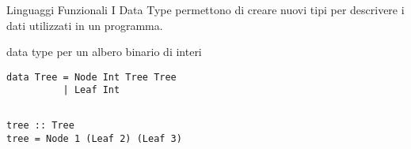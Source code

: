 \begin{frame}[containsverbatim]{Linguaggi Funzionali}
I {\color{blue} Data Type} permettono di creare nuovi tipi per descrivere i dati utilizzati in un programma. \\

\begin{block}{data type per un albero binario di interi}
\begin{verbatim}
data Tree = Node Int Tree Tree 
          | Leaf Int
\end{verbatim}
\end{block}
\begin{example}
\begin{columns}

\begin{column}{.5\textwidth}	
\begin{verbatim}
tree :: Tree	
tree = Node 1 (Leaf 2) (Leaf 3)
\end{verbatim}
\end{column}	

\begin{column}{.2\textwidth}	
\end{column}	

\end{columns}
\end{example}
    
\end{frame}

